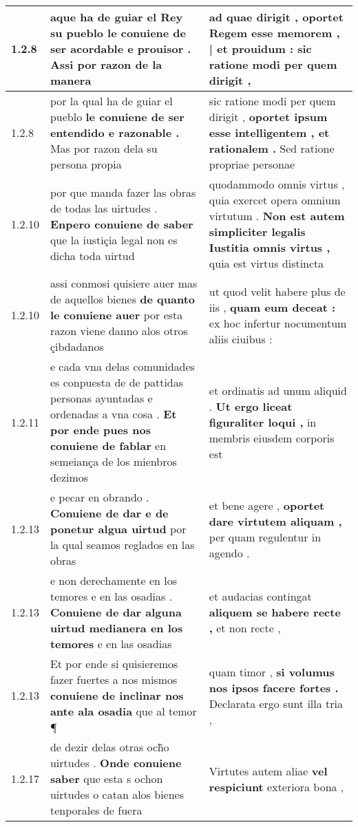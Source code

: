 \begin{tabular}{|p{1cm}|p{6.5cm}|p{6.5cm}|}
1.2.8 & aque ha de guiar el Rey su pueblo \textbf{ le conuiene de ser acordable e prouisor . } Assi por razon de la manera & ad quae dirigit , \textbf{ oportet Regem esse memorem , | et prouidum : } sic ratione modi per quem dirigit , \\\hline
1.2.8 & por la qual ha de guiar el pueblo \textbf{ le conuiene de ser entendido e razonable . } Mas por razon dela su persona propia & sic ratione modi per quem dirigit , \textbf{ oportet ipsum esse intelligentem , et rationalem . } Sed ratione propriae personae \\\hline
1.2.10 & por que manda fazer las obras de todas las uirtudes . \textbf{ Enpero conuiene de saber } que la iustiçia legal non es dicha toda uirtud & quodammodo omnis virtus , quia exercet opera omnium virtutum . \textbf{ Non est autem simpliciter legalis Iustitia omnis virtus , } quia est virtus distincta \\\hline
1.2.10 & assi conmosi quisiere auer mas de aquellos bienes \textbf{ de quanto le conuiene auer } por esta razon viene danno alos otros çibdadanos & ut quod velit habere plus de iis , \textbf{ quam eum deceat : } ex hoc infertur nocumentum aliis ciuibus : \\\hline
1.2.11 & e cada vna delas comunidades es conpuesta de de pattidas personas ayuntadas e ordenadas a vna cosa . \textbf{ Et por ende pues nos conuiene de fablar } en semeiança de los mienbros dezimos & et ordinatis ad unum aliquid . \textbf{ Ut ergo liceat figuraliter loqui , } in membris eiusdem corporis est \\\hline
1.2.13 & e pecar en obrando . \textbf{ Conuiene de dar e de ponetur algua uirtud } por la qual seamos reglados en las obras & et bene agere , \textbf{ oportet dare virtutem aliquam , } per quam regulentur in agendo . \\\hline
1.2.13 & e non derechamente en los temores e en las osadias . \textbf{ Conuiene de dar alguna uirtud medianera en los temores } e en las osadias & et audacias contingat \textbf{ aliquem se habere recte , } et non recte , \\\hline
1.2.13 & Et por ende si quisieremos fazer fuertes a nos mismos \textbf{ conuiene de inclinar nos ante ala osadia } que al temor ¶ & quam timor , \textbf{ si volumus nos ipsos facere fortes . } Declarata ergo sunt illa tria , \\\hline
1.2.17 & de dezir delas otras och̃o uirtudes . \textbf{ Onde conuiene saber } que esta s ochon uirtudes o catan alos bienes tenporales de fuera & Virtutes autem aliae \textbf{ vel respiciunt } exteriora bona , \\\hline

\end{tabular}
